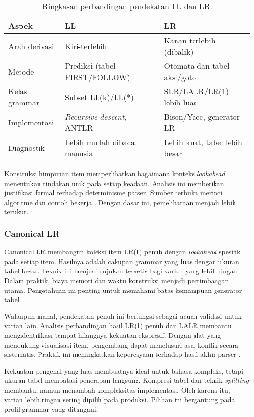 \documentclass[../main.tex]{subfiles}
\begin{document}
\begin{table}[t]
  \centering
  \caption{Ringkasan perbandingan pendekatan LL dan LR.}
  \label{tab:ll-vs-lr}
  \begin{tabular}{@{}lll@{}}
    \toprule
    Aspek & LL & LR \\
    \midrule
    Arah derivasi & Kiri-terlebih & Kanan-terlebih (dibalik) \\
    Metode & Prediksi (tabel FIRST/FOLLOW) & Otomata dan tabel aksi/goto \\
    Kelas grammar & Subset LL(k)/LL(*) & SLR/LALR/LR(1) lebih luas \\
    Implementasi & \emph{Recursive descent}, ANTLR & Bison/Yacc, generator LR \\
    Diagnostik & Lebih mudah dibaca manusia & Lebih kuat, tabel lebih besar \\
    \bottomrule
  \end{tabular}
\end{table}

Konstruksi himpunan item memperlihatkan bagaimana konteks \emph{lookahead} menentukan tindakan unik pada setiap keadaan. Analisis ini memberikan justifikasi formal terhadap determinisme parser. Sumber terbuka merinci algoritme dan contoh bekerja \citep{WikiLR}. Dengan dasar ini, pemeliharaan menjadi lebih terukur.

\subsubsection{Canonical LR}
Canonical LR membangun koleksi item LR(1) penuh dengan \emph{lookahead} spesifik pada setiap item. Hasilnya adalah cakupan grammar yang luas dengan ukuran tabel besar. Teknik ini menjadi rujukan teoretis bagi varian yang lebih ringan. Dalam praktik, biaya memori dan waktu konstruksi menjadi pertimbangan utama. Pengetahuan ini penting untuk memahami batas kemampuan generator tabel.

Walaupun mahal, pendekatan penuh ini berfungsi sebagai acuan validasi untuk varian lain. Analisis perbandingan hasil LR(1) penuh dan LALR membantu mengidentifikasi tempat hilangnya kekuatan ekspresif. Dengan alat yang mendukung visualisasi item, pengembang dapat menelusuri asal konflik secara sistematis. Praktik ini meningkatkan kepercayaan terhadap hasil akhir parser \citep{BisonManual}.

Kekuatan pengenal yang luas membuatnya ideal untuk bahasa kompleks, tetapi ukuran tabel membatasi penerapan langsung. Kompresi tabel dan teknik \emph{splitting} membantu, namun menambah kompleksitas implementasi. Oleh karena itu, varian lebih ringan sering dipilih pada produksi. Pilihan ini bergantung pada profil grammar yang ditangani.
\end{document}
